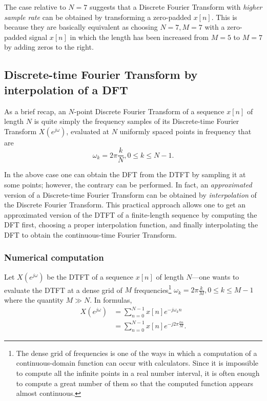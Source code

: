 \documentclass[\documentfontsize, twocolumn]{\classname}
\begin{document}
The case relative to $N=7$ suggests that a Discrete Fourier Transform with \emph{higher sample rate} can be obtained by transforming a zero-padded $x[n]$. This is because they are basically equivalent as choosing $N=7, M=7$ with a zero-padded signal $x[n]$ in which the length has been increased from $M=5$ to $M=7$ by adding zeros to the right.


\subsection{Discrete-time Fourier Transform by interpolation of a DFT}

As a brief recap, an $N$-point Discrete Fourier Transform of a sequence $x[n]$ of length $N$ is quite simply the frequency samples of its Discrete-time Fourier Transform $X(e^{j\omega})$, evaluated at $N$ uniformly spaced points in frequency that are
\[
    \omega_k = 2\pi \frac k N, 0 \leq k \leq N-1.
\]

In the above case one can obtain the DFT from the DTFT by sampling it at some points; however, the contrary can be performed. In fact, an \emph{approximated} version of a Discrete-time Fourier Transform can be obtained by \emph{interpolation} of the Discrete Fourier Transform. This practical approach allows one to get an approximated version of the DTFT of a finite-length sequence by computing the DFT first, choosing a proper interpolation function, and finally interpolating the DFT to obtain the continuous-time Fourier Transform.

\subsubsection{Numerical computation}

Let $X(e^{j\omega})$ be the DTFT of a sequence $x[n]$ of length $N$---one wants to evaluate the DTFT at a dense grid of $M$ frequencies\footnote{
The dense grid of frequencies is one of the ways in which a computation of a continuous-domain function can occur with calculators. Since it is impossible to compute all the infinite points in a real number interval, it is often enough to compute a great number of them so that the computed function appears almost continuous.
} $\omega_k = 2\pi \frac k M, 0 \leq k \leq M-1$ where the quantity $M \gg N$. In formulas,
\begin{align*}
    X(e^{j\omega})
    &= \sum_{n=0}^{N-1} x[n] e^{-j\omega_k n}\\
    &= \sum_{n=0}^{N-1} x[n] e^{-j2\pi \frac{kn}{M}}.
\end{align*}
\end{document}
